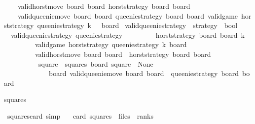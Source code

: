 \begin{isabellebody}
\ \ \ \ valid{\isacharunderscore}horst{\isacharunderscore}move\ board\ board{\isacharprime}{\isacharsemicolon}\ horst{\isacharunderscore}strategy\ board\ board{\isacharprime}{\isacharsemicolon}\isanewline
\ \ \ \ valid{\isacharunderscore}queenie{\isacharunderscore}move\ board{\isacharprime}\ board{\isacharprime}{\isacharprime}{\isacharsemicolon}\ queenie{\isacharunderscore}strategy\ board{\isacharprime}\ board{\isacharprime}{\isacharprime}{\isasymrbrakk}{\isasymLongrightarrow}\ valid{\isacharunderscore}game\ horst{\isacharunderscore}strategy\ queenie{\isacharunderscore}strategy\ {\isacharparenleft}k\ {\isacharplus}\ {}{\isacharparenright}\ board{\isacharprime}{\isacharprime}{\isachardoublequoteclose}\isanewline
\isanewline
{}\isamarkupfalse%
\ valid{\isacharunderscore}queenie{\isacharunderscore}strategy\ {\isacharcolon}{\isacharcolon}\ {\isachardoublequoteopen}strategy\ {\isasymRightarrow}\ bool{\isachardoublequoteclose}\ \isanewline
\ \ {\isachardoublequoteopen}valid{\isacharunderscore}queenie{\isacharunderscore}strategy\ queenie{\isacharunderscore}strategy\ {\isasymlongleftrightarrow}\ \isanewline
\ \ \ \ \ {\isacharparenleft}{\isasymforall}\ \ horst{\isacharunderscore}strategy\ board\ board{\isacharprime}\ k{\isachardot}\ \isanewline
\ \ \ \ \ \ \ \ \ valid{\isacharunderscore}game\ horst{\isacharunderscore}strategy\ queenie{\isacharunderscore}strategy\ k\ board\ {\isasymand}\isanewline
\ \ \ \ \ \ \ \ \ valid{\isacharunderscore}horst{\isacharunderscore}move\ board\ board{\isacharprime}\ {\isasymand}\ horst{\isacharunderscore}strategy\ board\ board{\isacharprime}\ {\isasymand}\isanewline
\ \ \ \ \ \ \ \ \ {\isacharparenleft}{\isasymexists}\ square\ {\isasymin}\ squares{\isachardot}\ board{\isacharprime}\ square\ {\isacharequal}\ None{\isacharparenright}\ {\isasymlongrightarrow}\ \isanewline
\ \ \ \ \ \ \ \ \ \ \ \ {\isacharparenleft}{\isasymexists}\ board{\isacharprime}{\isacharprime}{\isachardot}\ valid{\isacharunderscore}queenie{\isacharunderscore}move\ board{\isacharprime}\ board{\isacharprime}{\isacharprime}\ {\isasymand}\ queenie{\isacharunderscore}strategy\ board{\isacharprime}\ board{\isacharprime}{\isacharprime}{\isacharparenright}{\isacharparenright}{\isachardoublequoteclose}%
\begin{isamarkuptext}%
squares%
\end{isamarkuptext}\isamarkuptrue%
\isamarkupfalse%
\ squares{\isacharunderscore}card\ {\isacharbrackleft}simp{\isacharbrackright}{\isacharcolon}\isanewline
\ \ \ {\isachardoublequoteopen}card\ squares\ {\isacharequal}\ files\ {\isacharasterisk}\ ranks{\isachardoublequoteclose}\isanewline

\end{isabellebody}
